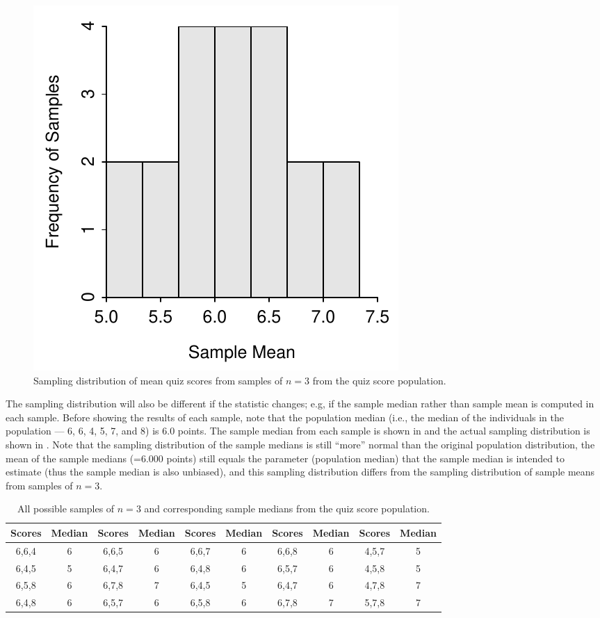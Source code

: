 \documentclass[10pt,openany]{book}\usepackage[]{graphicx}\usepackage[]{color}
\newenvironment{knitrout}{}{} %
\begin{document}
\begin{knitrout}
\color{fgcolor}\begin{figure}[hbtp]

{\centering \includegraphics[width=.37\linewidth]{Figs/SDistQuiz3-1} 

}

\caption[Sampling distribution of mean quiz scores from samples of $n=3$ from the quiz score population]{Sampling distribution of mean quiz scores from samples of $n=3$ from the quiz score population.}\label{fig:SDistQuiz3}
\end{figure}


\end{knitrout}

The sampling distribution will also be different if the statistic changes; e.g, if the sample median rather than sample mean is computed in each sample. Before showing the results of each sample, note that the population median (i.e., the median of the individuals in the population --- 6, 6, 4, 5, 7, and 8) is 6.0 points. The sample median from each sample is shown in  and the actual sampling distribution is shown in . Note that the sampling distribution of the sample medians is still ``more'' normal than the original population distribution, the mean of the sample medians (=6.000 points) still equals the parameter (population median) that the sample median is intended to estimate (thus the sample median is also unbiased), and this sampling distribution differs from the sampling distribution of sample means from samples of $n=3$.

\vspace{-4pt}
\begin{table}[htbp]
  \caption{All possible samples of $n=3$ and corresponding sample medians from the quiz score population.}
  \label{tab:SDistQuizMdns3}
  \centering
    \begin{tabular}{cc||cc||cc||cc||cc}
\hline\hline
Scores & Median & Scores & Median & Scores &  Median & Scores & Median & Scores & Median \\
\hline
6,6,4 & 6 & 6,6,5 & 6 & 6,6,7 & 6 & 6,6,8 & 6 & 4,5,7 & 5 \\
6,4,5 & 5 & 6,4,7 & 6 & 6,4,8 & 6 & 6,5,7 & 6 & 4,5,8 & 5 \\
6,5,8 & 6 & 6,7,8 & 7 & 6,4,5 & 5 & 6,4,7 & 6 & 4,7,8 & 7 \\
6,4,8 & 6 & 6,5,7 & 6 & 6,5,8 & 6 & 6,7,8 & 7 & 5,7,8 & 7 \\
\hline\hline
    \end{tabular}
\end{table}
\end{document}
